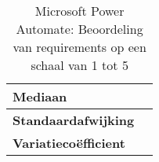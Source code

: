 \begin{table}[htbp]
{\begin{tabular}{|ll|}
    \multicolumn{1}{|l|}{\textbf{Mediaan}}                                                                                                                                                                                     &                              \\ \hline
    \multicolumn{1}{|l|}{\textbf{Standaardafwijking}}                                                                                                                                                                          &                              \\ \hline
    \multicolumn{1}{|l|}{\textbf{Variatiecoëfficient}}                                                                                                                                                                         &                              \\ \hline
    \end{tabular}%
    }
    \caption{Microsoft Power Automate: Beoordeling van requirements op een schaal van 1 tot 5}
    \end{table}


